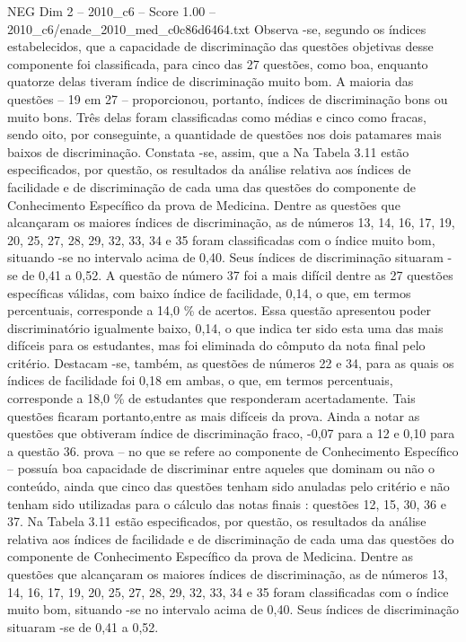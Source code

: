 \begin{textsample}{NEG Dim 2 – 2010\_c6 – Score 1.00 – 2010\_c6/enade\_2010\_med\_c0c86d6464.txt}
Observa -se, segundo os índices estabelecidos, que a capacidade de discriminação das questões objetivas desse componente foi classificada, para cinco das 27 questões, como boa, enquanto quatorze delas tiveram índice de discriminação muito bom.
A maioria das questões – 19 em 27 – proporcionou, portanto, índices de discriminação bons ou muito bons.
Três delas foram classificadas como médias e cinco como fracas, sendo oito, por conseguinte, a quantidade de questões nos dois patamares mais baixos de discriminação.
Constata -se, assim, que a Na Tabela 3.11 estão especificados, por questão, os resultados da análise relativa aos índices de facilidade e de discriminação de cada uma das questões do componente de Conhecimento Específico da prova de Medicina.
Dentre as questões que alcançaram os maiores índices de discriminação, as de números 13, 14, 16, 17, 19, 20, 25, 27, 28, 29, 32, 33, 34 e 35 foram classificadas com o índice muito bom, situando -se no intervalo acima de 0,40.
Seus índices de discriminação situaram -se de 0,41 a 0,52.
A questão de número 37 foi a mais difícil dentre as 27 questões específicas válidas, com baixo índice de facilidade, 0,14, o que, em termos percentuais, corresponde a 14,0 \% de acertos.
Essa questão apresentou poder discriminatório igualmente baixo, 0,14, o que indica ter sido esta uma das mais difíceis para os estudantes, mas foi eliminada do cômputo da nota final pelo critério.
Destacam -se, também, as questões de números 22 e 34, para as quais os índices de facilidade foi 0,18 em ambas, o que, em termos percentuais, corresponde a 18,0 \% de estudantes que responderam acertadamente.
Tais questões ficaram portanto,entre as mais difíceis da prova.
Ainda a notar as questões que obtiveram índice de discriminação fraco, -0,07 para a 12 e 0,10 para a questão 36. prova – no que se refere ao componente de Conhecimento Específico – possuía boa capacidade de discriminar entre aqueles que dominam ou não o conteúdo, ainda que cinco das questões tenham sido anuladas pelo critério e não tenham sido utilizadas para o cálculo das notas finais : questões 12, 15, 30, 36 e 37.
Na Tabela 3.11 estão especificados, por questão, os resultados da análise relativa aos índices de facilidade e de discriminação de cada uma das questões do componente de Conhecimento Específico da prova de Medicina.
Dentre as questões que alcançaram os maiores índices de discriminação, as de números 13, 14, 16, 17, 19, 20, 25, 27, 28, 29, 32, 33, 34 e 35 foram classificadas com o índice muito bom, situando -se no intervalo acima de 0,40.
Seus índices de discriminação situaram -se de 0,41 a 0,52.

\end{textsample}
